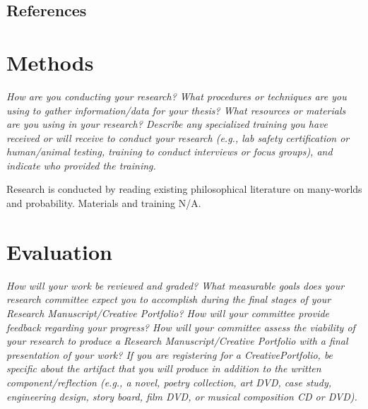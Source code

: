 \documentclass{article}
\begin{document}
 \vspace{2em}

\subsection{References}
\printbibliography[heading=none]

\section{Methods}

\emph{How are you conducting your research?
What procedures or techniques are you using to gather information/data for your thesis?
What resources or materials are you using in your research?
Describe any specialized training you have received or will receive to conduct your research (e.g., lab safety certification or human/animal testing, training to conduct interviews or focus groups), and indicate who provided the training.
}

\vspace{2em}
\noindent Research is conducted by reading existing philosophical literature on many-worlds and probability. Materials and training N/A.

\section{Evaluation}
\emph{How will your work be reviewed and graded?
What measurable goals does your research committee expect you to accomplish during the final stages of your Research Manuscript/Creative Portfolio?
How will your committee provide feedback regarding your progress?
How will your committee assess the viability of your research to produce a Research Manuscript/Creative Portfolio with a final presentation of your work?
If you are registering for a CreativePortfolio, be specific about the artifact that you will produce in addition to the written component/reflection (e.g., a novel, poetry collection, art DVD, case study, engineering design, story board, film DVD, or musical composition CD or DVD).
}
\end{document}
